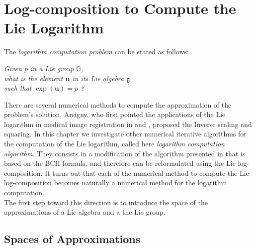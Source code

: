 \chapter{Log-composition to Compute the Lie Logarithm}\label{ch:log_algorithm}

%

\noindent
The \emph{logarithm computation problem} can be stated as follows:
\begin{center}
\emph{
	Given $p$ in a Lie group $\mathbb{G}$, \\ 
	what is the element $\mathbf{u}$ in its Lie algebra $\mathfrak{g}$ \\
	such that $\exp(\mathbf{u}) = p$ ?  
}
\end{center}
There are several numerical methods to compute the approximation of the problem's solution. Arsigny, who first pointed the applications of the Lie logarithm in medical image registration in \cite{Arsigny:MRM:06} and \cite{arsigny2006bi}, proposed the Inverse scaling and squaring. In this chapter we investigate other numerical iterative algorithms for the computation of the Lie logarithm, called here \emph{logarithm computation algorithm}. They consists in a modification of the algorithm presented in \cite{Bossa:08} that is based on the BCH formula, and therefore can be reformulated using the Lie log-composition. 
It turns out that each of the numerical method to compute the Lie log-composition becomes naturally a numerical method for the logarithm computation.\\
The first step toward this direction is to introduce the space of the approximations of a Lie algebra and a the Lie group.


\section{Spaces of Approximations}\label{se:space_of_approximation}


